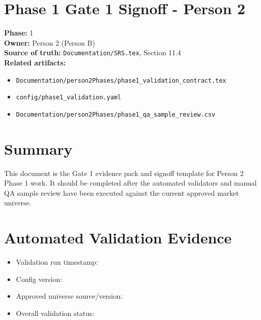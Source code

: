 \documentclass{article}
\begin{document}
\section*{Phase 1 Gate 1 Signoff - Person 2}

\textbf{Phase:} 1\\
\textbf{Owner:} Person 2 (Person B)\\
\textbf{Source of truth:} \texttt{Documentation/SRS.tex}, Section 11.4\\
\textbf{Related artifacts:}
\begin{itemize}
\item \texttt{Documentation/person2Phases/phase1\_validation\_contract.tex}
\item \texttt{config/phase1\_validation.yaml}
\item \texttt{Documentation/person2Phases/phase1\_qa\_sample\_review.csv}
\end{itemize}

\section*{Summary}

This document is the Gate 1 evidence pack and signoff template for Person 2
Phase 1 work. It should be completed after the automated validators and manual
QA sample review have been executed against the current approved market
universe.

\section*{Automated Validation Evidence}

\begin{itemize}
\item Validation run timestamp: \underline{\hspace{8cm}}
\item Config version: \underline{\hspace{8cm}}
\item Approved universe source/version: \underline{\hspace{8cm}}
\item Overall validation status: \underline{\hspace{8cm}}
\end{itemize}
\end{document}
